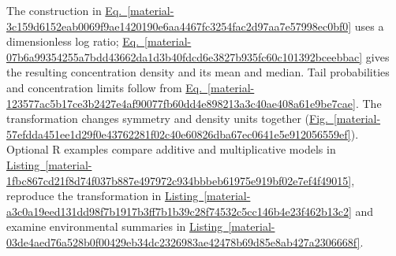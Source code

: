 \documentclass[11pt,a4paper]{article}
\begin{document}
\medskip

The construction in \hyperref[material-3c159d6152eab0069f9ae1420190e6aa4467fc3254fac2d97aa7e57998ec0bf0]{Eq.~\ref*{material-3c159d6152eab0069f9ae1420190e6aa4467fc3254fac2d97aa7e57998ec0bf0}} uses a dimensionless log ratio; \hyperref[material-07b6a99354255a7bdd43662da1d3b40fdcd6e3827b935fc60c101392bceebbac]{Eq.~\ref*{material-07b6a99354255a7bdd43662da1d3b40fdcd6e3827b935fc60c101392bceebbac}} gives the resulting concentration density and its mean and median. Tail probabilities and concentration limits follow from \hyperref[material-123577ac5b17ce3b2427e4af90077fb60dd4e898213a3c40ae408a61e9be7cae]{Eq.~\ref*{material-123577ac5b17ce3b2427e4af90077fb60dd4e898213a3c40ae408a61e9be7cae}}. The transformation changes symmetry and density units together (\hyperref[material-57efdda451ee1d29f0e43762281f02c40e60826dba67ec0641e5e912056559ef]{Fig.~\ref*{material-57efdda451ee1d29f0e43762281f02c40e60826dba67ec0641e5e912056559ef}}). Optional R examples compare additive and multiplicative models in \hyperref[material-1fbc867cd21f8d74f037b887e497972c934bbbeb61975e919bf02e7ef4f49015]{Listing~\ref*{material-1fbc867cd21f8d74f037b887e497972c934bbbeb61975e919bf02e7ef4f49015}}, reproduce the transformation in \hyperref[material-a3c0a19eed131dd98f7b1917b3ff7b1b39c28f74532c5cc146b4e23f462b13c2]{Listing~\ref*{material-a3c0a19eed131dd98f7b1917b3ff7b1b39c28f74532c5cc146b4e23f462b13c2}} and examine environmental summaries in \hyperref[material-03de4aed76a528b0f00429eb34dc2326983ae42478b69d85e8ab427a2306668f]{Listing~\ref*{material-03de4aed76a528b0f00429eb34dc2326983ae42478b69d85e8ab427a2306668f}}.
\end{document}
